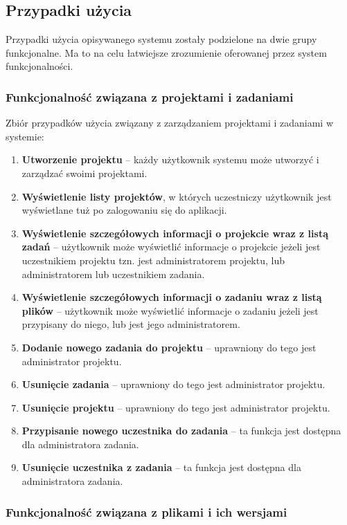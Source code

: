 \subsection*{Przypadki użycia}

Przypadki użycia opisywanego systemu zostały podzielone na dwie grupy funkcjonalne.
Ma to na celu łatwiejsze zrozumienie oferowanej przez system funkcjonalności.

\subsubsection{Funkcjonalność związana z projektami i zadaniami}

Zbiór przypadków użycia związany z zarządzaniem projektami i zadaniami w systemie:
\begin{enumerate}
    \item \textbf{Utworzenie projektu} -- każdy użytkownik systemu może utworzyć i zarządzać swoimi projektami.
    \item \textbf{Wyświetlenie listy projektów}, w których uczestniczy użytkownik jest wyświetlane tuż po zalogowaniu się do aplikacji.
    \item \textbf{Wyświetlenie szczegółowych informacji o projekcie wraz z listą zadań} -- użytkownik może wyświetlić informacje o projekcie jeżeli jest uczestnikiem projektu tzn. jest administratorem projektu, lub administratorem lub uczestnikiem zadania.
    \item \textbf{Wyświetlenie szczegółowych informacji o zadaniu wraz z listą plików} -- użytkownik może wyświetlić informacje o zadaniu jeżeli jest przypisany do niego, lub jest jego administratorem.
    \item \textbf{Dodanie nowego zadania do projektu} -- uprawniony do tego jest administrator projektu.
    \item \textbf{Usunięcie zadania} -- uprawniony do tego jest administrator projektu.
    \item \textbf{Usunięcie projektu} -- uprawniony do tego jest administrator projektu.
    \item \textbf{Przypisanie nowego uczestnika do zadania} -- ta funkcja jest dostępna dla administratora zadania.
    \item \textbf{Usunięcie uczestnika z zadania} -- ta funkcja jest dostępna dla administratora zadania.
\end{enumerate}

\subsubsection{Funkcjonalność związana z plikami i ich wersjami}

